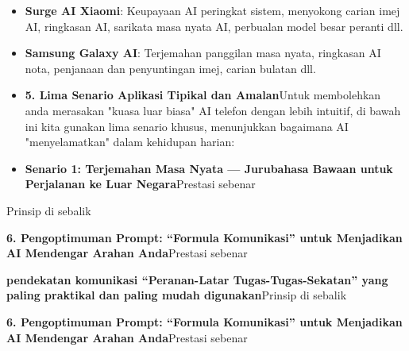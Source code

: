 
\begin{itemize}
  \item \textbf{Surge AI Xiaomi}: Keupayaan AI peringkat sistem, menyokong carian imej AI, ringkasan AI, sarikata masa nyata AI, perbualan model besar peranti dll.
  \item \textbf{Samsung Galaxy AI}: Terjemahan panggilan masa nyata, ringkasan AI nota, penjanaan dan penyuntingan imej, carian bulatan dll.
  \item \textbf{5. Lima Senario Aplikasi Tipikal dan Amalan}Untuk membolehkan anda merasakan "kuasa luar biasa" AI telefon dengan lebih intuitif, di bawah ini kita gunakan lima senario khusus, menunjukkan bagaimana AI "menyelamatkan" dalam kehidupan harian:
  \item \textbf{Senario 1: Terjemahan Masa Nyata — Jurubahasa Bawaan untuk Perjalanan ke Luar Negara}Prestasi sebenar
\end{itemize}


Prinsip di sebalik


\textbf{6. Pengoptimuman Prompt: “Formula Komunikasi” untuk Menjadikan AI Mendengar Arahan Anda}Prestasi sebenar

\textbf{pendekatan komunikasi “Peranan-Latar Tugas-Tugas-Sekatan” yang paling praktikal dan paling mudah digunakan}Prinsip di sebalik


\textbf{6. Pengoptimuman Prompt: “Formula Komunikasi” untuk Menjadikan AI Mendengar Arahan Anda}Prestasi sebenar

